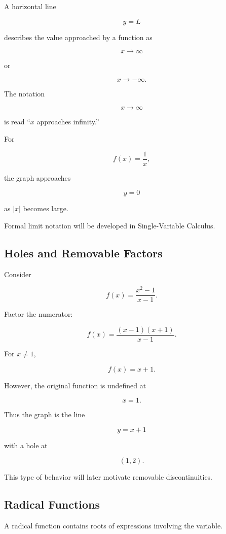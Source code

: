 A horizontal line

\[ y=L \]

describes the value approached by a function as

\[ x\to\infty \]

or

\[ x\to-\infty. \]

The notation

\[ x\to\infty \]

is read ``\(x\) approaches infinity.''

For

\[ f(x)=\frac1x, \]

the graph approaches

\[ y=0 \]

as \(|x|\) becomes large.

Formal limit notation will be developed in Single-Variable Calculus.

\subsection{Holes and Removable Factors}
\label{subsec:rational-holes}

Consider

\[ f(x)=\frac{x^2-1}{x-1}. \]

Factor the numerator:

\[ f(x)=\frac{(x-1)(x+1)}{x-1}. \]

For \(x\neq1\),

\[ f(x)=x+1. \]

However, the original function is undefined at

\[ x=1. \]

Thus the graph is the line

\[ y=x+1 \]

with a hole at

\[ (1,2). \]

This type of behavior will later motivate removable discontinuities.

\subsection{Radical Functions}
\label{subsec:radical-functions-analysis}

A radical function contains roots of expressions involving the variable.

